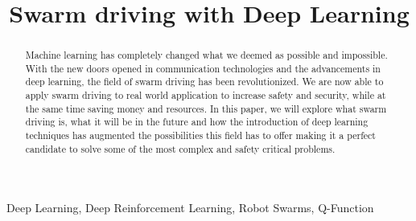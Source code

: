 \documentclass[conference]{IEEEtran}
\begin{document}
\title{Swarm driving with Deep Learning\\
}

\author{

}

\maketitle

\begin{abstract}
Machine learning has completely changed what we deemed as possible and impossible. With the new doors opened in communication technologies and the advancements in deep learning, the field of swarm driving has been revolutionized. We are now able to apply swarm driving to real world application to increase safety and security, while at the same time saving money and resources. 
In this paper, we will explore what swarm driving is, what it will be in the future and how the introduction of deep learning techniques has augmented the possibilities this field has to offer making it a perfect candidate to solve some of the most complex and safety critical problems.
\end{abstract}

\begin{IEEEkeywords}
Deep Learning, Deep Reinforcement Learning, Robot Swarms, Q-Function
\end{IEEEkeywords}
\end{document}

